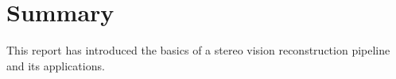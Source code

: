 \section{Summary}

This report has introduced the basics of a stereo vision reconstruction pipeline and its applications.
